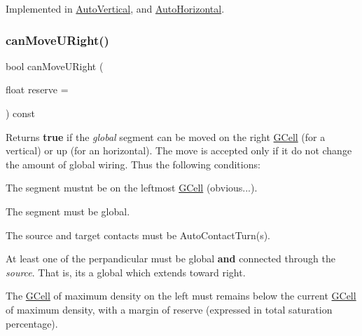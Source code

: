 Implemented in \hyperlink{classKatabatic_1_1AutoVertical_a9b0c21eeb26c256876592ba63438da74}{Auto\+Vertical}, and \hyperlink{classKatabatic_1_1AutoHorizontal_a9b0c21eeb26c256876592ba63438da74}{Auto\+Horizontal}.

\mbox{\label{classKatabatic_1_1AutoSegment_a096deb8a143f098eac2bff9ab9c52243}} 
\subsubsection{\texorpdfstring{can\+Move\+U\+Right()}{canMoveURight()}}
{\footnotesize\ttfamily bool can\+Move\+U\+Right (\begin{DoxyParamCaption}\item[{float}]{reserve = {} }\end{DoxyParamCaption}) const\hspace{0.3cm}{\ttfamily [pure virtual]}}

\begin{DoxyReturn}{Returns}
{\bfseries true} if the {\itshape global} segment can be moved on the right \hyperlink{classKatabatic_1_1GCell}{G\+Cell} (for a vertical) or up (for an horizontal). The move is accepted only if it do not change the amount of global wiring. Thus the following conditions\+:
\begin{DoxyItemize}
\item The segment mustn\textquotesingle{}t be on the leftmost \hyperlink{classKatabatic_1_1GCell}{G\+Cell} (obvious...).
\item The segment must be global.
\item The source and target contacts must be Auto\+Contact\+Turn(s).
\item At least one of the perpandicular must be global {\bfseries and} connected through the {\itshape source}. That is, it\textquotesingle{}s a global which extends toward right.
\item The \hyperlink{classKatabatic_1_1GCell}{G\+Cell} of maximum density on the left must remains below the current \hyperlink{classKatabatic_1_1GCell}{G\+Cell} of maximum density, with a margin of {\ttfamily reserve} (expressed in total saturation percentage). 
\end{DoxyItemize}
\end{DoxyReturn}


